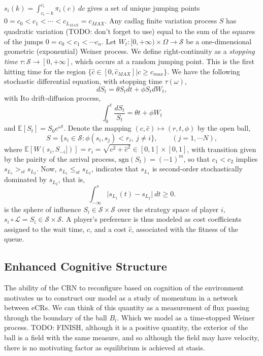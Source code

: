 \documentclass[10pt]{article}
\newcommand{\mcL}{\mathcal{L}}
\newcommand{\mcS}{\mathcal{S}}
\theoremstyle{definition}
\begin{document}
$s_i(k) = \int_{c_i - k}^{c_i} \pi_i(c) \ dc$ gives a set of unique jumping points $0=c_0<
c_1< \cdots < c_{L_{MAX}} = c_{MAX}$. 
Any cadlag finite variation process $S$ has quadratic variation (TODO: don't
forget to use) equal to the sum
of the squares of the jumps $0=c_0<c_1<\cdots c_n$.
Let $W_t: [0, +\infty) \times \Omega \rightarrow \mcS$ be a
one-dimensional geometric (exponential) Weiner process. We define right-continuity as 
a \emph{stopping time} $\tau:\mcS \rightarrow [0,+\infty]$, which occurs at a random jumping point. This is the first hitting time
for the region $\lbrace \hat c \in [0,\hat c_{MAX}] \vert c \ge c_{max}\rbrace$.
We have the following stochastic differential equation, with stopping time
$\tau(\omega)$,
$$
    dS_t = \theta S_t dt + \phi S_t dW_t,
$$
with Ito drift-diffusion process,
$$
    \displaystyle\int_0^t \frac{dS_t}{S_t} = \theta t + \phi W_t
$$
and $\mathbb{E}[S_t] = S_0e^{\omega t}$.
Denote the mapping $(c, \hat c) \mapsto (r, t, \phi)$ by the open ball,
$$
    S = \lbrace s_i \in \mcS : \phi(s_i, s_j) < r_i, \ j\ne i \rbrace, \qquad (j
    = 1, \cdots N),
$$
where $\mathbb{E}[W(s_i, S_{-i}])] = r_i = \sqrt{c^2 + \hat c^2} \in [0,1]\times
[0,1]$, with transition given by the pairity of the arrival process,
$\text{sgn}(S_t) = (-1)^m$, so that $c_1<c_2$ implies $s_{L_1} >_{st} s_{L_2}$.
Now, $s_{L_1} \le_{st} s_{L_2}$, indicates that $s_{L_1}$ is second-order
stochastically dominated by $s_{L_2}$, that is, 
$$
    \displaystyle\int_{-\infty}^s\vert s_{L_1}(t) - s_{L_2} \vert \ dt \ge 0.
$$
is the sphere of influence $S_i \in \mcS\times\mcS$ over the strategy
space of player $i$, $s_i\circ\mcL = S_i \in \mcS\times\mcS$.
A player's preference is thus modeled as cost coefficients assigned to the wait
time, $c$, and a cost $\hat c$, associated with the fitness of the queue.

\subsection{Enhanced Cognitive Structure}

The ability of the CRN to reconfigure based on cognition of the environment
motivates us to construct our model as a study of momentum in a network between eCRs. 
We can think of this quantity as a measurement of flux passing through the
boundary of the ball $B_i$. Which we model as a time-stopped Weiner process.
TODO: FINISH, although it is a positive quantity, the exterior of
the ball is a field with the same measure, and so although the field may have
velocity, there is no motivating factor as equilibrium is achieved at stasis.
\end{document}
